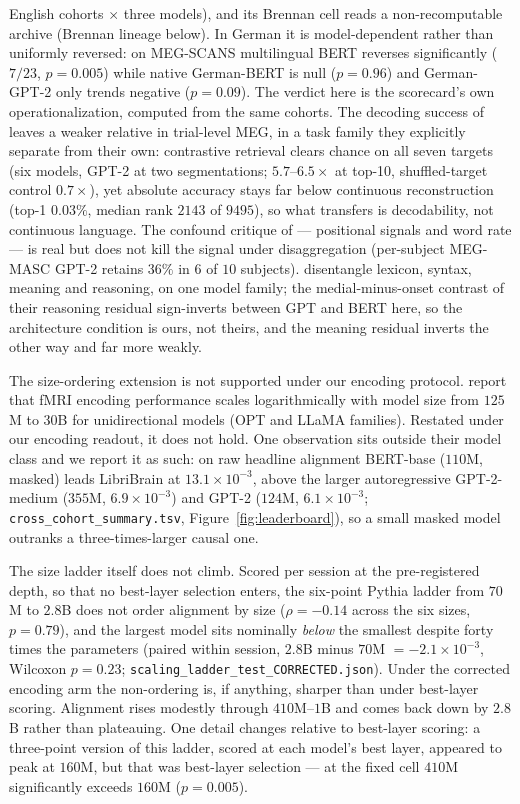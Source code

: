 \documentclass{article}
\begin{document}
English cohorts $\times$ three models), and its Brennan cell reads a non-recomputable archive
(Brennan lineage below). In German it is model-dependent rather than uniformly reversed: on MEG-SCANS
multilingual BERT reverses significantly ($7/23$, $p = 0.005$) while native German-BERT is null
($p = 0.96$) and German-GPT-2 only trends negative ($p = 0.09$). The verdict here is the
scorecard's own operationalization, computed from the same cohorts. The decoding success of
\citet{tang2023semantic} leaves a weaker relative in trial-level MEG, in a task family they
explicitly separate from their own: contrastive
retrieval clears chance on all seven targets (six models, GPT-2 at two segmentations; $5.7$--$6.5\times$ at top-10, shuffled-target
control $0.7\times$), yet absolute accuracy stays far below continuous reconstruction (top-1
$0.03\%$, median rank $2143$ of $9495$), so what transfers is decodability, not continuous
language.
The confound critique of \citet{feghhi2026spurious} --- positional signals and word rate --- is
real but does not kill the signal under disaggregation (per-subject MEG-MASC GPT-2 retains $36\%$ in $6$ of
$10$ subjects). \citet{he2025reasoning} disentangle lexicon, syntax, meaning and reasoning, on one model family;
the medial-minus-onset contrast of their reasoning residual sign-inverts between GPT and BERT here,
so the architecture condition is ours, not theirs, and the meaning residual inverts the other way
and far more weakly.

The size-ordering extension is not supported under our encoding protocol. \citet{antonello2024scaling} report that fMRI encoding performance
scales logarithmically with model size from $125$M to $30$B for unidirectional models (OPT and
LLaMA families). Restated under our encoding readout, it does not hold. One observation sits
outside their model class and we report it as such: on raw
headline alignment BERT-base ($110$M, masked) leads
LibriBrain at $13.1\times10^{-3}$, above the larger autoregressive GPT-2-medium
($355$M, $6.9\times10^{-3}$) and GPT-2 ($124$M, $6.1\times10^{-3}$;
\texttt{cross\_cohort\_summary.tsv}, Figure~\ref{fig:leaderboard}), so a small masked
model outranks a three-times-larger causal one.

The size ladder itself does not climb. Scored per session at the pre-registered depth, so that
no best-layer selection enters, the six-point Pythia ladder from $70$M to $2.8$B does not order
alignment by size ($\rho = -0.14$ across the six sizes, $p = 0.79$), and the largest model sits
nominally \emph{below} the smallest despite forty times the parameters (paired within session,
$2.8$B minus $70$M $= -2.1\times10^{-3}$, Wilcoxon $p = 0.23$;
\texttt{scaling\_ladder\_test\_CORRECTED.json}). Under the corrected encoding arm the
non-ordering is, if anything, sharper than under best-layer scoring. Alignment rises modestly through $410$M--$1$B and comes
back down by $2.8$B rather than plateauing. One detail changes relative to best-layer
scoring: a three-point version of this ladder, scored at each model's best layer, appeared to peak
at $160$M, but that was best-layer selection --- at the fixed cell $410$M significantly exceeds
$160$M ($p = 0.005$).
\end{document}
